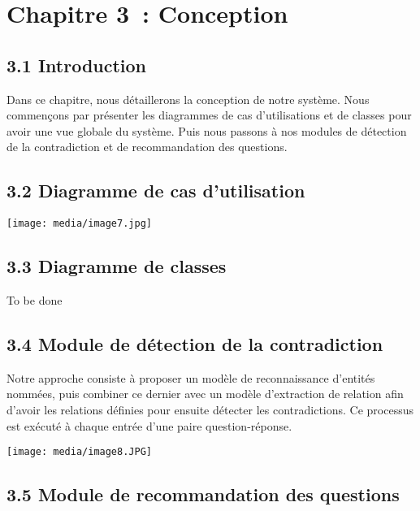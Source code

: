 \documentclass[
]{article}
\begin{document}
\section{Chapitre 3~: Conception}\label{chapitre-3-conception}

\subsection{3.1 Introduction}\label{introduction-8}

Dans ce chapitre, nous détaillerons la conception de notre système. Nous
commençons par présenter les diagrammes de cas d'utilisations et de
classes pour avoir une vue globale du système. Puis nous passons à nos
modules de détection de la contradiction et de recommandation des
questions.

\subsection{\texorpdfstring{3.2 Diagramme de cas d'utilisation
}{3.2 Diagramme de cas d'utilisation }}\label{diagramme-de-cas-dutilisation}

\texttt{[image: media/image7.jpg]}

\subsection{3.3 Diagramme de classes}\label{diagramme-de-classes}

To be done

\subsection{3.4 Module de détection de la
contradiction}\label{module-de-duxe9tection-de-la-contradiction}

Notre approche consiste à proposer un modèle de reconnaissance d'entités
nommées, puis combiner ce dernier avec un modèle d'extraction de
relation afin d'avoir les relations définies pour ensuite détecter les
contradictions. Ce processus est exécuté à chaque entrée d'une paire
question-réponse.

\texttt{[image: media/image8.JPG]}

\subsection{3.5 Module de recommandation des
questions}\label{module-de-recommandation-des-questions}
\end{document}
